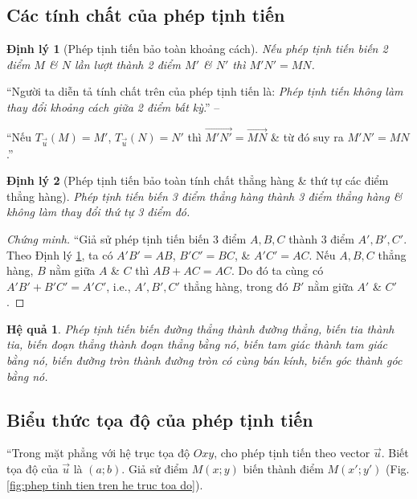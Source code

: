 \documentclass[oneside]{book}
\numberwithin{equation}{section}
\newtheorem{hequa}{Hệ quả}[section]
\newtheorem{dinhly}{Định lý}[section]
\begin{document}
\subsection{Các tính chất của phép tịnh tiến}

\begin{dinhly}[Phép tịnh tiến bảo toàn khoảng cách]
	\label{thm: phep tinh tien bao toan khoang cach}
	Nếu phép tịnh tiến biến 2 điểm $M$ \& $N$ lần lượt thành 2 điểm $M'$ \& $N'$ thì $M'N' = MN$.
\end{dinhly}
``Người ta diễn tả tính chất trên của phép tịnh tiến là: \textit{Phép tịnh tiến không làm thay đổi khoảng cách giữa 2 điểm bất kỳ}.'' -- \cite[p. 6]{SGK_Toan_11_hinh_hoc_nang_cao}

``Nếu $T_{\vec{u}}(M) = M'$, $T_{\vec{u}}(N) = N'$ thì $\overrightarrow{M'N'} = \overrightarrow{MN}$ \& từ đó suy ra $M'N' = MN$.''

\begin{dinhly}[Phép tịnh tiến bảo toàn tính chất thẳng hàng \& thứ tự các điểm thẳng hàng]
	Phép tịnh tiến biến 3 điểm thẳng hàng thành 3 điểm thẳng hàng \& không làm thay đổi thứ tự 3 điểm đó.
\end{dinhly}

\begin{proof}[Chứng minh]
	``Giả sử phép tịnh tiến biến 3 điểm $A,B,C$ thành 3 điểm $A',B',C'$. Theo Định lý \ref{thm: phep tinh tien bao toan khoang cach}, ta có $A'B' = AB$, $B'C' = BC$, \& $A'C' = AC$. Nếu $A,B,C$ thẳng hàng, $B$ nằm giữa $A$ \& $C$ thì $AB + AC = AC$. Do đó ta cùng có $A'B' + B'C' = A'C'$, i.e., $A',B',C'$ thẳng hàng, trong đó $B'$ nằm giữa $A'$ \& $C'$.
\end{proof}

\begin{hequa}
	Phép tịnh tiến biến đường thẳng thành đường thẳng, biến tia thành tia, biến đoạn thẳng thành đoạn thẳng bằng nó, biến tam giác thành tam giác bằng nó, biến đường tròn thành đường tròn có cùng bán kính, biến góc thành góc bằng nó.
\end{hequa}

\subsection{Biểu thức tọa độ của phép tịnh tiến}
``Trong mặt phẳng với hệ trục tọa độ $Oxy$, cho phép tịnh tiến theo vector $\vec{u}$. Biết tọa độ của $\vec{u}$ là $(a;b)$. Giả sử điểm $M(x;y)$ biến thành điểm $M(x';y')$ (Fig. \ref{fig:phep tinh tien tren he truc toa do}).
\end{document}
